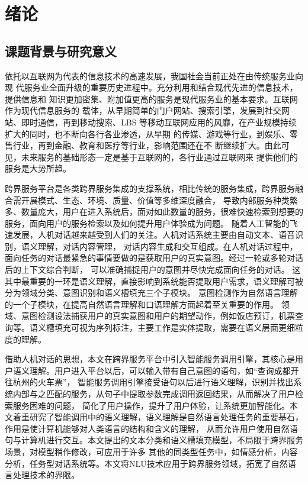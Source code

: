 \chapter{绪论}

\section{课题背景与研究意义}

依托以互联网为代表的信息技术的高速发展，我国社会当前正处在由传统服务业向现
代服务业全面升级的重要历史进程中。充分利用和结合现代先进的信息技术，提供信息和
知识更加密集、附加值更高的服务是现代服务业的基本要求。互联网作为现代信息服务的
载体，从早期简单的门户网站、搜索引擎，发展到社交网站、即时通信，再到移动搜索、LBS
等移动互联网应用的风靡，在产业规模持续扩大的同时，也不断向各行各业渗透，从早期
的传媒、游戏等行业，到娱乐、零售行业，再到金融、教育和医疗等行业，影响范围还在不
断继续扩大\cite{王晓玲2015我国现代服务业借力}。由此可见，未来服务的基础形态一定是基于互联网的，各行业通过互联网来
提供他们的服务是大势所趋。


跨界服务平台是各类跨界服务集成的支撑系统，相比传统的服务集成，跨界服务融合需开展模式、生态、环境、质量、价值等多维深度融合，
导致内部服务种类繁多、数量庞大，用户在进入系统后，面对如此数量的服务，很难快速检索到想要的服务，面向用户的服务检索以及如何提升用户体验成为问题。
随着人工智能的飞速发展，人机对话越来越受到人们的关注。人机对话系统主要由自动文本、语音识别，语义理解，对话内容管理，
对话内容生成和交互组成。在人机对话过程中，面向任务的对话最紧急的事情要做的是获取用户的真实意图。经过一轮或多轮对话后的上下文综合判断，
可以准确捕捉用户的意图并尽快完成面向任务的对话。
这其中最重要的一环是语义理解，直接影响到系统能否提取用户需求，语义理解可被分为领域分类、意图识别和语义槽填充三个子模块。
意图检测作为自然语言理解的一个子模块，在提高自然语言理解和口语理解方面起着至关重要的作用。
领域、意图检测设法捕获用户的真实意图和用户的期望动作，例如饭店预订，机票查询等。语义槽填充可视为序列标注，主要工作是实体提取，需要在语义层面更细粒度的理解。

借助人机对话的思想，本文在跨界服务平台中引入智能服务调用引擎，其核心是用户语义理解。用户进入平台以后，可以输入带有自己意图的语句，如“查询成都开往杭州的火车票”，
智能服务调用引擎接受语句以后进行语义理解，识别并找出系统内部与之匹配的服务，从句子中提取参数完成调用返回结果，从而解决了用户检索服务困难的问题，
简化了用户操作，提升了用户体验，让系统更加智能化。本文着重研究了智能调用中的语义理解，语义理解是自然语言处理任务的重要基石，作用是使计算机能够对人类语言的结构和含义的理解，
从而允许用户使用自然语句与计算机进行交互。本文提出的文本分类和语义槽填充模型，不局限于跨界服务场景，对模型稍作修改，可应用于许多
其他的同类型任务中，如情感分析，内容分析，任务型对话系统等。本文将NLU技术应用于跨界服务领域，拓宽了自然语言处理技术的界限。

